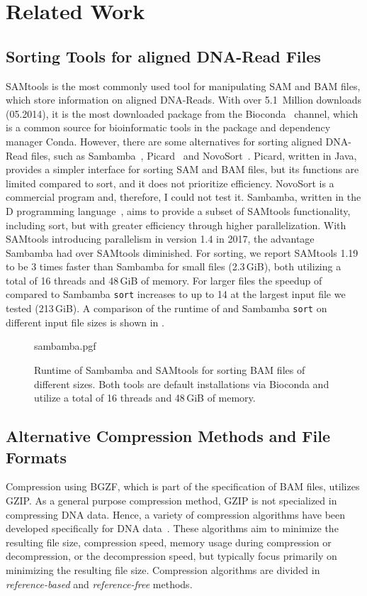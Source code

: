 \section{Related Work}

\subsection{Sorting Tools for aligned DNA-Read Files}
SAMtools is the most commonly used tool for manipulating SAM and BAM files, which store information on aligned DNA-Reads. With over 5.1~Million downloads (05.2014), it is the most downloaded package from the Bioconda~\cite{the_bioconda_team_bioconda_2018} channel, which is a common source for bioinformatic tools in the package and dependency manager Conda. However, there are some alternatives for sorting aligned DNA-Read files, such as Sambamba~\cite{tarasov_sambamba_2015}, Picard~\cite{Picard2019toolkit} and NovoSort~\cite{noauthor_novosort_nodate}. Picard, written in Java, provides a simpler interface for sorting SAM and BAM files, but its functions are limited compared to sort, and it does not prioritize efficiency. NovoSort is a commercial program and, therefore, I could not test it. Sambamba, written in the D programming language~\cite{alexandrescu_d_2010}, aims to provide a subset of SAMtools functionality, including sort, but with greater efficiency through higher parallelization. With SAMtools introducing parallelism in version 1.4 in 2017, the advantage Sambamba had over SAMtools diminished. For sorting, we report SAMtools 1.19 to be 3 times faster than Sambamba for small files (2.3\,GiB), both utilizing a total of 16 threads and 48\,GiB of memory. For larger files the speedup of \sort compared to Sambamba \texttt{sort} increases to up to 14 at the largest input file we tested (213\,GiB). A comparison of the runtime of \sort and Sambamba \texttt{sort} on different input file sizes is shown in .\\
\begin{figure}[t]
        {sambamba.pgf}
    \caption{Runtime of Sambamba and SAMtools for sorting BAM files of different sizes. Both tools are default installations via Bioconda and utilize a total of 16 threads and 48\,GiB of memory. }
    \label{fig:sambamba}
\end{figure}

\subsection{Alternative Compression Methods and File Formats}
Compression using BGZF, which is part of the specification of BAM files, utilizes GZIP. As a general purpose compression method, GZIP is not specialized in compressing DNA data. Hence, a variety of compression algorithms have been developed specifically for DNA data~\cite{hosseini_survey_2016}. These algorithms aim to minimize the resulting file size, compression speed, memory usage during compression or decompression, or the decompression speed, but typically focus primarily on minimizing the resulting file size. Compression algorithms are divided in \textit{reference-based} and \textit{reference-free} methods. \\


